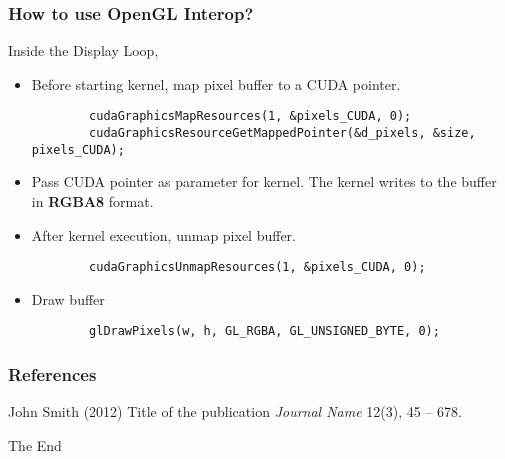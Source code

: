 \documentclass{beamer}
\begin{document}
\begin{frame}[fragile]
	\frametitle{How to use OpenGL Interop?}
	Inside the Display Loop,
	\begin{itemize}
		\item Before starting kernel, map pixel buffer to a CUDA pointer.
		\begin{lstlisting}
		cudaGraphicsMapResources(1, &pixels_CUDA, 0); 
		cudaGraphicsResourceGetMappedPointer(&d_pixels, &size,  pixels_CUDA);
		\end{lstlisting}
		\item Pass CUDA pointer as parameter for kernel. The kernel writes to the buffer in \textbf{RGBA8} format.
		\item After kernel execution, unmap pixel buffer.
		\begin{lstlisting}
		cudaGraphicsUnmapResources(1, &pixels_CUDA, 0);
		\end{lstlisting}
		\item Draw buffer
		\begin{lstlisting}
		glDrawPixels(w, h, GL_RGBA, GL_UNSIGNED_BYTE, 0);
		\end{lstlisting}
	\end{itemize}
\end{frame}

\begin{frame}
\frametitle{References}
\footnotesize{
\begin{thebibliography}{99} %
 John Smith (2012)
\newblock Title of the publication
\newblock \emph{Journal Name} 12(3), 45 -- 678.
\end{thebibliography}
}
\end{frame}


\begin{frame}
\Huge{\centerline{The End}}
\end{frame}

\end{document}
